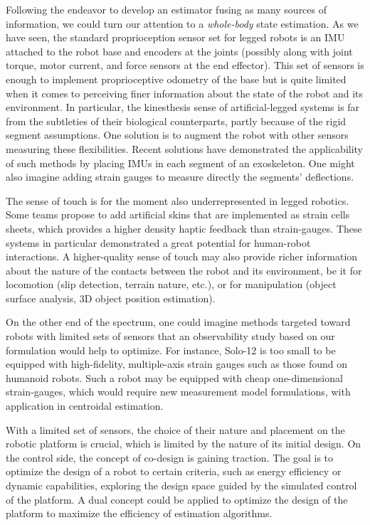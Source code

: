 Following the endeavor to develop an estimator fusing as many sources of information, we could turn our attention to a 
\textit{whole-body} state estimation. As we have seen, the standard proprioception sensor set for legged robots is an IMU attached to the robot base
and encoders at the joints (possibly along with joint torque, motor current, and force sensors at the end effector). This set of sensors
is enough to implement proprioceptive odometry of the base but is quite limited when it comes to perceiving finer information about the state of the robot
and its environment. In particular, the kinesthesis sense of artificial-legged systems is far from the subtleties of their biological counterparts, partly
because of the rigid segment assumptions. One solution is to augment the robot with other sensors measuring these flexibilities. Recent solutions have demonstrated
the applicability of such methods by placing IMUs in each segment of an exoskeleton. One might also imagine adding strain gauges to measure directly 
the segments' deflections. 

The sense of touch is for the moment also underrepresented in legged robotics. Some teams propose to add
artificial skins that are implemented as strain cells sheets, which provides a higher density haptic feedback than strain-gauges. 
These systems in particular demonstrated a great potential for human-robot interactions. 
A higher-quality sense of touch may also provide richer information about the nature of the contacts between the robot and its environment, be it for locomotion
(slip detection, terrain nature, etc.), or for manipulation (object surface analysis, 3D object position estimation). 

On the other end of the spectrum, one could imagine methods targeted toward robots with limited sets of sensors that
an observability study based on our formulation would help to optimize. For instance, Solo-12 is too small to be 
equipped with high-fidelity, multiple-axis strain gauges such as those found on humanoid robots. Such a robot may be equipped with cheap
one-dimensional strain-gauges, which would require new measurement model formulations, with application in centroidal estimation.

With a limited set of sensors, the choice of their nature and placement on the robotic platform is crucial, which is limited by the nature of its initial design. 
On the control side, the concept of co-design is gaining traction. The goal is
to optimize the design of a robot to certain criteria, such as energy efficiency or dynamic capabilities, exploring the design space guided by 
the simulated control of the platform. A dual concept could be applied to optimize the design of the platform to maximize the efficiency of estimation algorithms.

